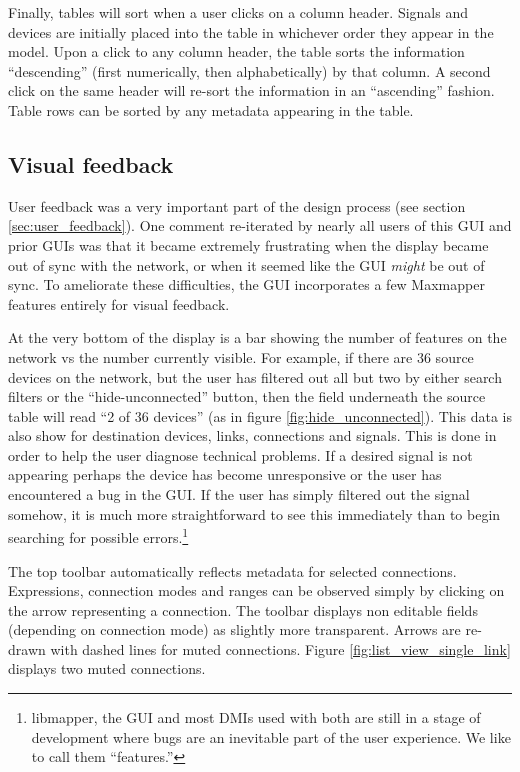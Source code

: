 Finally, tables will sort when a user clicks on a column header. Signals and devices are initially placed into the table in whichever order they appear in the model. Upon a click to any column header, the table sorts the information ``descending'' (first numerically, then alphabetically) by that column. A second click on the same header will re-sort the information in an ``ascending'' fashion. Table rows can be sorted by any metadata appearing in the table.


	\subsection{Visual feedback} %
	\label{sub:visual_feedback}

User feedback was a very important part of the design process (see section \ref{sec:user_feedback}). One comment re-iterated by nearly all users of this GUI and prior GUIs was that it became extremely frustrating when the display became out of sync with the network, or when it seemed like the GUI \emph{might} be out of sync. To ameliorate these difficulties, the GUI incorporates a few Maxmapper features entirely for visual feedback.
		
At the very bottom of the display is a bar showing the number of features on the network vs the number currently visible. For example, if there are 36 source devices on the network, but the user has filtered out all but two by either search filters or the ``hide-unconnected'' button, then the field underneath the source table will read ``2 of 36 devices'' (as in figure \ref{fig:hide_unconnected}). This data is also show for destination devices, links, connections and signals. This is done in order to help the user diagnose technical problems. If a desired signal is not appearing perhaps the device has become unresponsive or the user has encountered a bug in the GUI. If the user has simply filtered out the signal somehow, it is much more straightforward to see this immediately than to begin searching for possible errors.\footnote{libmapper, the GUI and most DMIs used with both are still in a stage of development where bugs are an inevitable part of the user experience. We like to call them ``features.''}

The top toolbar automatically reflects metadata for selected connections. Expressions, connection modes and ranges can be observed simply by clicking on the arrow representing a connection. The toolbar displays non editable fields (depending on connection mode) as slightly more transparent. Arrows are re-drawn with dashed lines for muted connections. Figure \ref{fig:list_view_single_link} displays two muted connections. 

